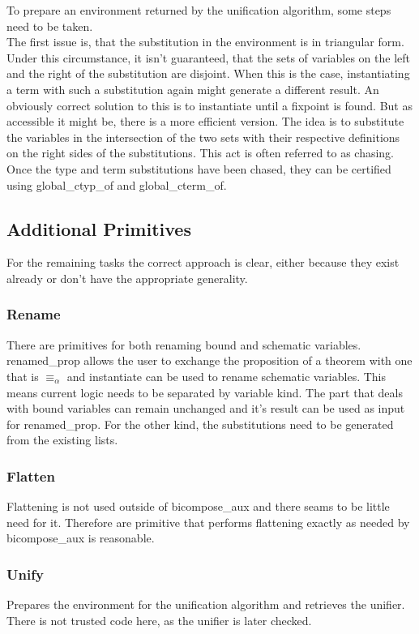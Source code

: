 To prepare an environment returned by the unification algorithm, some steps need to be taken.\\
The first issue is, that the substitution in the environment is in triangular form. Under this circumstance, it isn't guaranteed, that the sets of variables on the left and the right of the substitution are disjoint. When this is the case, instantiating a term with such a substitution again might generate a different result. An obviously correct solution to this is to instantiate until a fixpoint is found. But as accessible it might be, there is a more efficient version. The idea is to substitute the variables in the intersection of the two sets with their respective definitions on the right sides of the substitutions. This act is often referred to as chasing. Once the type and term substitutions have been chased, they can be certified using global\_ctyp\_of and global\_cterm\_of.

\subsection{Additional Primitives}

For the remaining tasks the correct approach is clear, either because they exist already or don't have the appropriate generality.

\subsubsection{Rename} There are primitives for both renaming bound and schematic variables. renamed\_prop allows the user to exchange the proposition of a theorem with one that is $\equiv_\alpha$ and instantiate can be used to rename schematic variables. This means current logic needs to be separated by variable kind. The part that deals with bound variables can remain unchanged and it's result can be used as input for renamed\_prop. For the other kind, the substitutions need to be generated from the existing lists.
\subsubsection{Flatten} Flattening is not used outside of bicompose\_aux and there seams to be little need for it. Therefore are primitive that performs flattening exactly as needed by bicompose\_aux is reasonable.
\subsubsection{Unify} Prepares the environment for the unification algorithm and retrieves the unifier. There is not trusted code here, as the unifier is later checked.
